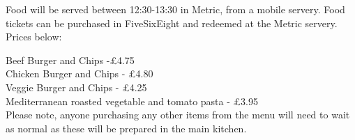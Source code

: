 Food will be served between 12:30-13:30 in Metric, from a mobile servery. Food tickets can be purchased in FiveSixEight and redeemed at the Metric servery. Prices below:

Beef Burger and Chips -£4.75\\
Chicken Burger and Chips - £4.80\\
Veggie Burger and Chips - £4.25\\
Mediterranean roasted vegetable and tomato pasta - £3.95\\
Please note, anyone purchasing any other items from the menu will need to wait as normal as these will be prepared in the main kitchen.